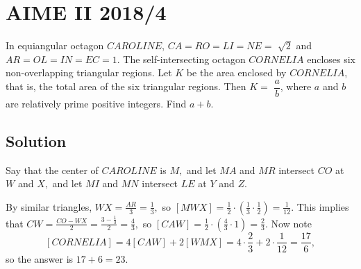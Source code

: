 \documentclass[blue,onecol]{shooting}
\begin{document}
\begin{center}
\end{center}

\section{AIME II 2018/4}

In equiangular octagon $CAROLINE$, $CA = RO = LI = NE =$ $\sqrt{2}$ and $AR = OL = IN = EC = 1$. The self-intersecting octagon $CORNELIA$ encloses six non-overlapping triangular regions. Let $K$ be the area enclosed by $CORNELIA$, that is, the total area of the six triangular regions. Then $K =$ $\dfrac{a}{b}$, where $a$ and $b$ are relatively prime positive integers. Find $a + b$.

\subsection{Solution}

Say that the center of $CAROLINE$ is $M,$ and let $MA$ and $MR$ intersect $CO$ at $W$ and $X,$ and let $MI$ and $MN$ intersect $LE$ at $Y$ and $Z.$

By similar triangles, $WX=\frac{AR}{3}=\frac{1}{3},$ so $[MWX]=\frac{1}{2}\cdot (\frac{1}{3}\cdot \frac{1}{2})=\frac{1}{12}.$ This implies that $CW=\frac{CO-WX}{2}=\frac{3-\frac{1}{3}}{2}=\frac{4}{3},$ so $[CAW]=\frac{1}{2}\cdot (\frac{4}{3}\cdot 1)=\frac{2}{3}.$ Now note
\[[CORNELIA]=4[CAW]+2[WMX]=4\cdot \frac{2}{3}+2\cdot\frac{1}{12}=\frac{17}{6},\]
so the answer is $17+6=23.$
\end{document}
